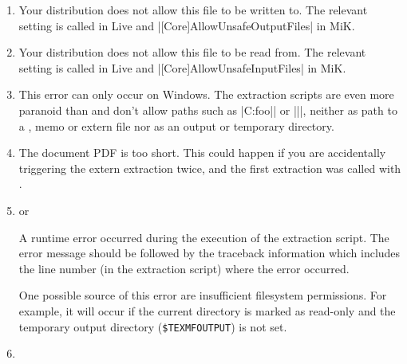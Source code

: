 \documentclass[a4paper,11pt]{article}
\begin{document}
\begin{enumerate}
\item\label{item:error:openin_any}

  Your  distribution does not allow this file to be written to.
  The relevant setting is called  in Live and
  |[Core]AllowUnsafeOutputFiles| in MiK.

\item {}

  Your  distribution does not allow this file to be read from. The
  relevant setting is called  in Live and
  |[Core]AllowUnsafeInputFiles| in MiK.
  
\item {}

  This error can only occur on Windows.  The extraction scripts are even more
  paranoid than  and don't allow paths such as |C:foo\bar| or
  |\foo\bar|, neither as path to a \dmmz, memo or extern file nor as an output
  or temporary directory.

\item {}

  The document PDF is too short. This could happen if you are accidentally
  triggering the extern extraction twice, and the first extraction was called
  with .

\item\label{item:error:runtime}  or 

  A runtime error occurred during the execution of the extraction script.  The
  error message should be followed by the traceback information which includes
  the line number (in the extraction script) where the error occurred.

  One possible source of this error are insufficient filesystem permissions.
  For example, it will occur if the current directory is marked as read-only
  and the temporary output directory (\texttt{\$TEXMFOUTPUT}) is not set.
  
\item {}


\end{enumerate}
\end{document}
